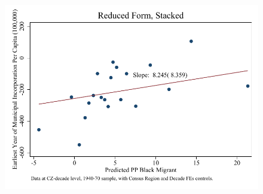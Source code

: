 \documentclass{article}
\begin{document}
\begin{figure}
\centering
\includegraphics{figures/simplefigs/stacked_cgoodman_full_pc_C3_urban_rf.pdf}
\end{figure}
\clearpage
\end{document}
